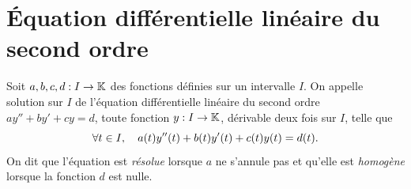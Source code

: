 \documentclass{magnoliaold}
\begin{document}



\section{Équation différentielle linéaire du second ordre}

\begin{definition}
Soit $a,b,c,d:I\to\mathbb{K}$ des fonctions définies sur un intervalle $I$. On appelle solution sur $I$ de l'équation différentielle linéaire du second ordre $ay''+by'+cy=d$, toute fonction $y:I\to\mathbb{K}$, dérivable deux fois sur $I$, telle que
\[\forall t\in I ,\quad a(t)y''(t)+b(t)y'(t)+c(t)y(t)=d(t).\]
On dit que l'équation est \emph{résolue} lorsque $a$ ne s'annule pas et qu'elle est \emph{homogène} lorsque la fonction $d$ est nulle.
\end{definition}
\end{document}

